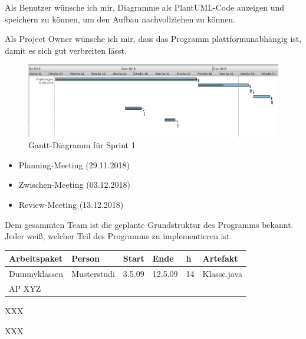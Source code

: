 Als Benutzer wünsche ich mir, Diagramme als PlantUML-Code anzeigen und speichern zu können, um den Aufbau nachvollziehen zu können.
\nsecend

Als Project Owner wünsche ich mir, dass das Programm plattformunabhängig ist, damit es sich gut verbreiten lässt.
\nsecend
\nsecend %

\begin{figure}[hbtp]
\centering
\includegraphics[width=\textwidth]{Bilder/gantt}
\caption{Gantt-Diagramm für Sprint 1}
\end{figure}
\nsecend

\begin{itemize}
\item Planning-Meeting (29.11.2018)
\item Zwischen-Meeting (03.12.2018)
\item Review-Meeting (13.12.2018)
\end{itemize}
\nsecend

Dem gesammten Team ist die geplante Grundstruktur des Programms bekannt. Jeder weiß, welcher Teil des Programms zu implementieren ist.
\nsecend

\begin{longtable}{|p{4cm}|l|l|l|l|l|}
        \hline
        Arbeitspaket & Person & Start & Ende & h & Artefakt\\
        \hline
        Dummyklassen & Musterstudi & 3.5.09 & 12.5.09 & 14 & Klasse.java\\ \hline
        AP XYZ &  &  &  & & \\ \hline
\end{longtable}     
\nsecend

XXX
\nsecend

XXX
\nsecend

